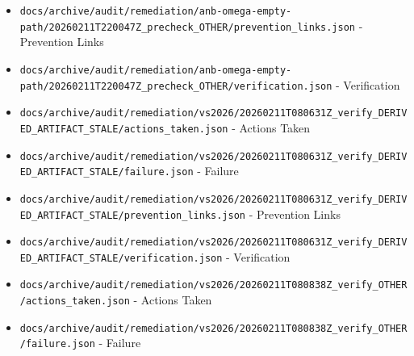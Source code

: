 \documentclass[10.5pt,a4paper,openany]{book}
\begin{document}
\begin{itemize}
\item \texttt{docs/\allowbreak{}archive/\allowbreak{}audit/\allowbreak{}remediation/\allowbreak{}anb-\allowbreak{}omega-\allowbreak{}empty-\allowbreak{}path/\allowbreak{}20260211T220047Z\_\allowbreak{}precheck\_\allowbreak{}OTHER/\allowbreak{}prevention\_\allowbreak{}links.\allowbreak{}json} -\allowbreak{} Prevention Links
\item \texttt{docs/\allowbreak{}archive/\allowbreak{}audit/\allowbreak{}remediation/\allowbreak{}anb-\allowbreak{}omega-\allowbreak{}empty-\allowbreak{}path/\allowbreak{}20260211T220047Z\_\allowbreak{}precheck\_\allowbreak{}OTHER/\allowbreak{}verification.\allowbreak{}json} -\allowbreak{} Verification
\item \texttt{docs/\allowbreak{}archive/\allowbreak{}audit/\allowbreak{}remediation/\allowbreak{}vs2026/\allowbreak{}20260211T080631Z\_\allowbreak{}verify\_\allowbreak{}DERIVED\_\allowbreak{}ARTIFACT\_\allowbreak{}STALE/\allowbreak{}actions\_\allowbreak{}taken.\allowbreak{}json} -\allowbreak{} Actions Taken
\item \texttt{docs/\allowbreak{}archive/\allowbreak{}audit/\allowbreak{}remediation/\allowbreak{}vs2026/\allowbreak{}20260211T080631Z\_\allowbreak{}verify\_\allowbreak{}DERIVED\_\allowbreak{}ARTIFACT\_\allowbreak{}STALE/\allowbreak{}failure.\allowbreak{}json} -\allowbreak{} Failure
\item \texttt{docs/\allowbreak{}archive/\allowbreak{}audit/\allowbreak{}remediation/\allowbreak{}vs2026/\allowbreak{}20260211T080631Z\_\allowbreak{}verify\_\allowbreak{}DERIVED\_\allowbreak{}ARTIFACT\_\allowbreak{}STALE/\allowbreak{}prevention\_\allowbreak{}links.\allowbreak{}json} -\allowbreak{} Prevention Links
\item \texttt{docs/\allowbreak{}archive/\allowbreak{}audit/\allowbreak{}remediation/\allowbreak{}vs2026/\allowbreak{}20260211T080631Z\_\allowbreak{}verify\_\allowbreak{}DERIVED\_\allowbreak{}ARTIFACT\_\allowbreak{}STALE/\allowbreak{}verification.\allowbreak{}json} -\allowbreak{} Verification
\item \texttt{docs/\allowbreak{}archive/\allowbreak{}audit/\allowbreak{}remediation/\allowbreak{}vs2026/\allowbreak{}20260211T080838Z\_\allowbreak{}verify\_\allowbreak{}OTHER/\allowbreak{}actions\_\allowbreak{}taken.\allowbreak{}json} -\allowbreak{} Actions Taken
\item \texttt{docs/\allowbreak{}archive/\allowbreak{}audit/\allowbreak{}remediation/\allowbreak{}vs2026/\allowbreak{}20260211T080838Z\_\allowbreak{}verify\_\allowbreak{}OTHER/\allowbreak{}failure.\allowbreak{}json} -\allowbreak{} Failure

\end{itemize}
\end{document}
